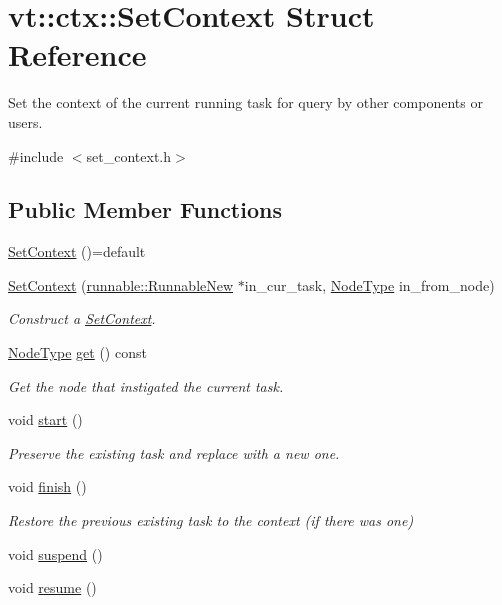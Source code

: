 \hypertarget{structvt_1_1ctx_1_1_set_context}{}\section{vt\+:\+:ctx\+:\+:Set\+Context Struct Reference}
\label{structvt_1_1ctx_1_1_set_context}


Set the context of the current running task for query by other components or users.  




{\ttfamily \#include $<$set\+\_\+context.\+h$>$}

\subsection*{Public Member Functions}
\begin{DoxyCompactItemize}
\item 
\hyperlink{structvt_1_1ctx_1_1_set_context_afe7801893d4377046b6fc91c003bd883}{Set\+Context} ()=default
\item 
\hyperlink{structvt_1_1ctx_1_1_set_context_a97e3ed34824011a693dec0a7d01f668b}{Set\+Context} (\hyperlink{structvt_1_1runnable_1_1_runnable_new}{runnable\+::\+Runnable\+New} $\ast$in\+\_\+cur\+\_\+task, \hyperlink{namespacevt_a866da9d0efc19c0a1ce79e9e492f47e2}{Node\+Type} in\+\_\+from\+\_\+node)
\begin{DoxyCompactList}\small\item\em Construct a {\ttfamily \hyperlink{structvt_1_1ctx_1_1_set_context}{Set\+Context}}. \end{DoxyCompactList}\item 
\hyperlink{namespacevt_a866da9d0efc19c0a1ce79e9e492f47e2}{Node\+Type} \hyperlink{structvt_1_1ctx_1_1_set_context_ab809e42e05e4ee549fbecc6962307d77}{get} () const
\begin{DoxyCompactList}\small\item\em Get the node that instigated the current task. \end{DoxyCompactList}\item 
void \hyperlink{structvt_1_1ctx_1_1_set_context_a271e2a9370869f1ca9539bf496760b31}{start} ()
\begin{DoxyCompactList}\small\item\em Preserve the existing task and replace with a new one. \end{DoxyCompactList}\item 
void \hyperlink{structvt_1_1ctx_1_1_set_context_a3047cd3eb41cd234bf7c197d32327e2e}{finish} ()
\begin{DoxyCompactList}\small\item\em Restore the previous existing task to the context (if there was one) \end{DoxyCompactList}\item 
void \hyperlink{structvt_1_1ctx_1_1_set_context_aabc5e6b4061b15b07c42a0ec8108f829}{suspend} ()
\item 
void \hyperlink{structvt_1_1ctx_1_1_set_context_ab9cfd26c1453f6ab9ae5d9b3463676e0}{resume} ()
\end{DoxyCompactItemize}
